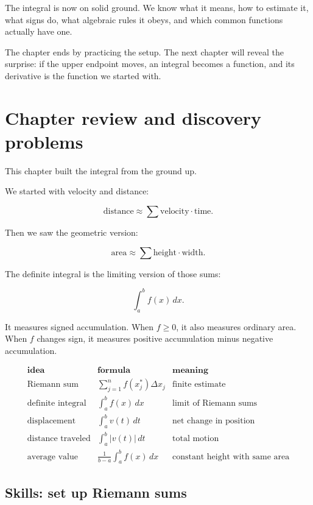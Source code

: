 The integral is now on solid ground.  We know what it means, how to estimate it,
what signs do, what algebraic rules it obeys, and which common functions actually
have one.

The chapter ends by practicing the setup.  The next chapter will reveal the surprise:
if the upper endpoint moves, an integral becomes a function, and its derivative is the
function we started with.

\section{Chapter review and discovery problems}
\label{sec:chapter8-review-discovery}

This chapter built the integral from the ground up.

We started with velocity and distance:

\[
\text{distance}\approx \sum \text{velocity}\cdot\text{time}.
\]

Then we saw the geometric version:

\[
\text{area}\approx \sum \text{height}\cdot\text{width}.
\]

The definite integral is the limiting version of those sums:

\[
\int_a^b f(x)\,dx.
\]

It measures signed accumulation.  When \(f\ge0\), it also measures ordinary area.
When \(f\) changes sign, it measures positive accumulation minus negative
accumulation.

\[
\begin{array}{c|c|c}
\textbf{idea} & \textbf{formula} & \textbf{meaning} \\ \hline
\text{Riemann sum}
&
\displaystyle \sum_{j=1}^n f(x_j^*)\Delta x_j
&
\text{finite estimate}
\\[2mm]
\text{definite integral}
&
\displaystyle \int_a^b f(x)\,dx
&
\text{limit of Riemann sums}
\\[2mm]
\text{displacement}
&
\displaystyle \int_a^b v(t)\,dt
&
\text{net change in position}
\\[2mm]
\text{distance traveled}
&
\displaystyle \int_a^b |v(t)|\,dt
&
\text{total motion}
\\[2mm]
\text{average value}
&
\displaystyle \frac{1}{b-a}\int_a^b f(x)\,dx
&
\text{constant height with same area}
\end{array}
\]

\subsection{Skills: set up Riemann sums}
\label{subsec:skills-set-up-riemann-sums}

